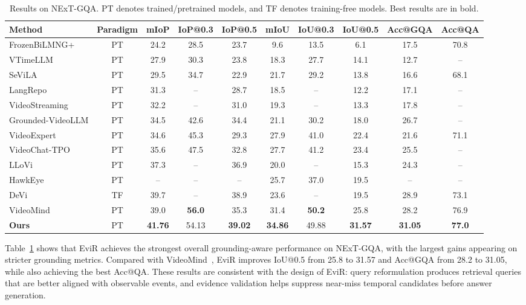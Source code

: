 \begin{table}[t]
\caption{Results on NExT-GQA. PT denotes trained/pretrained models, and TF denotes training-free models. Best results are in bold.}
\label{tab:nextgqa_results}
\centering
\scriptsize
\setlength{\tabcolsep}{3pt}
\begin{tabular}{lccccccccc}
\hline
Method & Paradigm & mIoP & IoP@0.3 & IoP@0.5 & mIoU & IoU@0.3 & IoU@0.5 & Acc@GQA & Acc@QA \\
\hline
FrozenBiLMNG+ \cite{yang2022zero} & PT & 24.2 & 28.5 & 23.7 & 9.6 & 13.5 & 6.1 & 17.5 & 70.8 \\
VTimeLLM \cite{huang2024vtimellm} & PT & 27.9 & 30.3 & 23.8 & 18.3 & 27.7 & 14.1 & 12.7 & -- \\
SeViLA \cite{yu2023sevila} & PT & 29.5 & 34.7 & 22.9 & 21.7 & 29.2 & 13.8 & 16.6 & 68.1 \\
LangRepo \cite{kahatapitiya2025language} & PT & 31.3 & -- & 28.7 & 18.5 & -- & 12.2 & 17.1 & -- \\
VideoStreaming \cite{qian2024streaming} & PT & 32.2 & -- & 31.0 & 19.3 & -- & 13.3 & 17.8 & -- \\
Grounded-VideoLLM \cite{wang2025grounded_videollm} & PT & 34.5 & 42.6 & 34.4 & 21.1 & 30.2 & 18.0 & 26.7 & -- \\
VideoExpert \cite{zhao2025videoexpert} & PT & 34.6 & 45.3 & 29.3 & 27.9 & 41.0 & 22.4 & 21.6 & 71.1 \\
VideoChat-TPO \cite{yan2025tpo} & PT & 35.6 & 47.5 & 32.8 & 27.7 & 41.2 & 23.4 & 25.5 & -- \\
LLoVi \cite{zhang2024simple} & PT & 37.3 & -- & 36.9 & 20.0 & -- & 15.3 & 24.3 & -- \\
HawkEye \cite{wang2024hawkeye} & PT & -- & -- & -- & 25.7 & 37.0 & 19.5 & -- & -- \\
DeVi \cite{qin2025question_answering_dense_video_events} & TF & 39.7 & -- & 38.9 & 23.6 & -- & 19.5 & 28.9 & 73.1 \\
VideoMind \cite{liu2025videomind} & PT & 39.0 & \textbf{56.0} & 35.3 & 31.4 & \textbf{50.2} & 25.8 & 28.2 & 76.9 \\
\hline
\textbf{Ours} & PT & \textbf{41.76} & 54.13 & \textbf{39.02} & \textbf{34.86} & 49.88 & \textbf{31.57} & \textbf{31.05} & \textbf{77.0} \\
\hline
\end{tabular}
\end{table}



Table~\ref{tab:nextgqa_results} shows that EviR achieves the strongest overall grounding-aware performance on NExT-GQA, with the largest gains appearing on stricter grounding metrics. Compared with VideoMind~\cite{liu2025videomind}, EviR improves IoU@0.5 from 25.8 to 31.57 and Acc@GQA from 28.2 to 31.05, while also achieving the best Acc@QA. These results are consistent with the design of EviR: query reformulation produces retrieval queries that are better aligned with observable events, and evidence validation helps suppress near-miss temporal candidates before answer generation.


